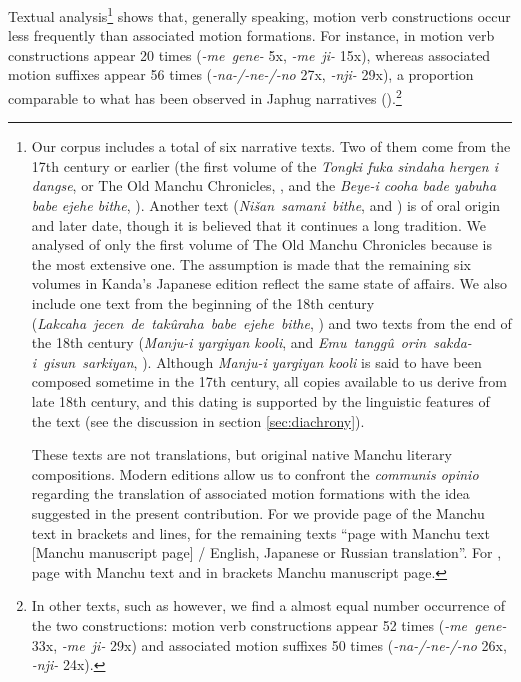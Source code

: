 \documentclass{article}
\newcommand{\ipa}[1]{\textit{{\phon\mbox{#1}}}} %
\begin{document}
Textual analysis\footnote{Our corpus includes a total of six narrative texts. Two of them come from the 17th century or earlier (the first volume of the \textit{Tongki fuka sindaha hergen i dangse}, or The Old Manchu Chronicles, \citet{kanda55tongki}, and the \textit{Beye-i cooha bade yabuha babe ejehe bithe}, \citealt{cosmo06dzengseo}). Another text  (\ipa{Nišan samani bithe}, \citealt{nowak77nisan} and \citealt{jaxontov93nisan}) is of oral origin and later date, though it is believed that it continues a long tradition. We analysed of only the first volume of The Old Manchu Chronicles because is the most extensive one. The assumption is made that the remaining six volumes in Kanda’s Japanese edition reflect the same state of affairs. We also include one text from the beginning of the 18th century (\ipa{Lakcaha jecen de takûraha babe ejehe bithe}, \citealt{shunjuu64tulishen}) and two texts from the end of the 18th century  (\textit{Manju-i yargiyan kooli}, \citealt{shunjuu92yargiyan} and \ipa{Emu tanggû orin sakda-i gisun sarkiyan}, \citealt{stary83sakda}). Although \textit{Manju-i yargiyan kooli }is said to have been composed sometime in the 17th century, all copies available to us derive from late 18th century, and this dating is supported by the linguistic features of the text (see the discussion in section \ref{sec:diachrony}).

These texts are not translations, but original native Manchu literary compositions. Modern editions allow us to confront the \textit{communis opinio} regarding the translation of associated motion formations with the idea suggested in the present contribution. For \citet{shunjuu92yargiyan} we provide page of the Manchu text in brackets and lines, for the remaining texts “page with Manchu text [Manchu manuscript page] / English, Japanese or Russian translation”. For \citet{stary83sakda}, page with Manchu text and in brackets Manchu manuscript page.} shows that, generally speaking, motion verb constructions occur less frequently than associated motion formations. For instance, in \citet{cosmo06dzengseo} motion verb constructions appear 20 times (\ipa{-me gene-} 5x, \ipa{-me ji-} 15x), whereas associated motion suffixes appear 56 times (\ipa{-na-/-ne-/-no} 27x, \ipa{-nji-} 29x), a proportion comparable to what has been observed in Japhug narratives (\citealt[209]{jacques13harmonization}).\footnote{In other texts, such as \citealt{jaxontov93nisan} however, we find a almost equal number occurrence of the two constructions:  motion verb constructions appear 52 times (\ipa{-me gene-} 33x, \ipa{-me ji-} 29x) and associated motion suffixes 50 times (\ipa{-na-/-ne-/-no} 26x, \ipa{-nji-} 24x).}
\end{document}
